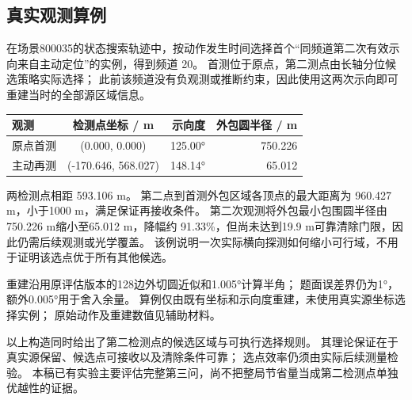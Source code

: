 \subsection{真实观测算例}\label{sec:q2-5}

在场景800035的状态搜索轨迹中，按动作发生时间选择首个``同频道第二次有效示向来自主动定位''的实例，得到频道 20。
首测位于原点，第二测点由长轴分位候选策略实际选择；
此前该频道没有负观测或推断约束，因此使用这两次示向即可重建当时的全部源区域信息。

\Needspace{38mm}
\begin{center}
\begin{minipage}{\linewidth}
\centering\small
{}
\label{tab:q2-example}
\vspace{4pt}
\begin{tabular}{@{}lcrr@{}}
\toprule
观测 & 检测点坐标 / m & 示向度 & 外包圆半径 / m \\
\midrule
原点首测 & (0.000, 0.000) & 125.00° & 750.226 \\
主动再测 & (-170.646, 568.027) & 148.14° & 65.012 \\
\bottomrule
\end{tabular}
\end{minipage}
\end{center}

两检测点相距 593.106 m。
第二点到首测外包区域各顶点的最大距离为 960.427 m，小于1000 m，满足保证再接收条件。
第二次观测将外包最小包围圆半径由750.226 m缩小至65.012 m，降幅约 91.33\%，但尚未达到19.9 m可靠清除门限，因此仍需后续观测或光学覆盖。
该例说明一次实际横向探测如何缩小可行域，不用于证明该选点优于所有其他候选。

重建沿用原评估版本的128边外切圆近似和1.005°计算半角；
题面误差界仍为1°，额外0.005°用于舍入余量。
算例仅由既有坐标和示向度重建，未使用真实源坐标选择实例；
原始动作及重建数值见辅助材料。

以上构造同时给出了第二检测点的候选区域与可执行选择规则。
其理论保证在于真实源保留、候选点可接收以及清除条件可靠；
选点效率仍须由实际后续测量检验。
本稿已有实验主要评估完整第三问，尚不把整局节省量当成第二检测点单独优越性的证据。
